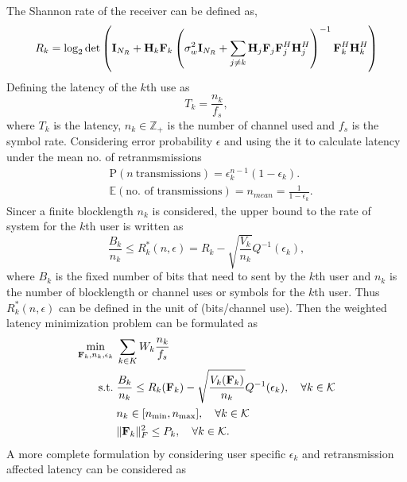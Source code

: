 \documentclass[a4paper, 12pt, onecolumn, journal, twoside, draftclsnofoot]{IEEEtran}
\begin{document}
The Shannon rate of the receiver can be defined as,
\begin{equation*}
	R_{k} =  \log_2 \det \left(  {\bf I}_{N_R}  +  {\bf H}_k {\bf F}_k     \left(  \sigma_w^2 {\bf I}_{N_R}  + \sum_{j \neq k}  {\bf H}_j {\bf F}_j {\bf F}_j^H {\bf H}_j^H  \right)^{-1}     {\bf F}_k^H {\bf H}_k^H  \right) 
\end{equation*}
Defining the latency of the $k$th use as 
\begin{equation*}
    T_{k} = \frac{n_k}{f_s}, 
\end{equation*}
where $T_{k}$ is the latency, $n_k \in \mathbb{Z}_+$ is the number of channel used and $f_s$ is the symbol rate.  Considering error probability $\epsilon$ and using the it to calculate latency under the mean no. of retranmsmissions 
\begin{equation*}
    \begin{split}
        &\text{P}(n \ \text{transmissions}) = \epsilon_k^{n-1}(1-\epsilon_k). \\
        &\mathbb{E}( \text{no. of transmissions}) = n_{mean} = \frac{1}{1-\epsilon_k}.
    \end{split}
\end{equation*}
Sincer a finite blocklength $n_k$ is considered, the upper bound to the rate of system for the $k$th user is written as \cite{durisi2016}
\begin{equation*}
	\frac{B_k}{n_k} \leq R_k^*(n, \epsilon) = R_k - \sqrt{\frac{V_k}{n_k}}Q^{-1}(\epsilon_k), 
\end{equation*}
where $B_k$ is the fixed number of bits that need to sent by the $k$th user and $n_k$ is the number of blocklength or channel uses or symbols for the $k$th user. Thus $R_k^*(n, \epsilon)$ can be defined in the unit of (bits/channel use).  Then the weighted latency minimization problem can be formulated as
\begin{equation}
	\begin{split}
		\min_{{\bf F}_k, n_k, \epsilon_k} &\; \sum_{k \in K} W_k \frac{n_k}{f_s} \\
		\text{s.t.} &\; \frac{B_k}{n_k} \leq R_k({\bf F}_k) - \sqrt{ \frac{V_k({\bf F}_k)}{n_k} } Q^{-1} (\epsilon_k), \quad \forall k \in { \mathcal{K} }\\
		&\; n_k \in [n_{\text{min}}, n_{\text{max}}], \quad \forall k \in { \mathcal{K} } \\
		& \; \|{\bf F}_k\|_F^2 \leq P_k, \quad \forall k \in { \mathcal{K} }.
	\end{split}
\label{eq_short_blocklength_latency_min_prob}
\end{equation}
A more complete formulation by considering user specific $\epsilon_k$ and retransmission affected latency can be considered as
\end{document}
